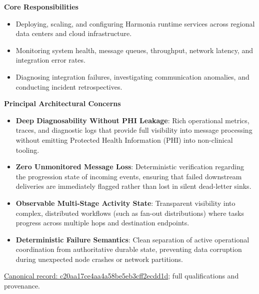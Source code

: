 \par\medskip\textbf{Core Responsibilities}\par


\begin{itemize}


\item Deploying, scaling, and configuring Harmonia runtime services across regional data centers and cloud infrastructure.

\item Monitoring system health, message queues, throughput, network latency, and integration error rates.

\item Diagnosing integration failures, investigating communication anomalies, and conducting incident retrospectives.

\end{itemize}


\par\medskip\textbf{Principal Architectural Concerns}\par


\begin{itemize}


\item \textbf{Deep Diagnosability Without PHI Leakage}: Rich operational metrics, traces, and diagnostic logs that provide full visibility into message processing without emitting Protected Health Information (PHI) into non-clinical tooling.

\item \textbf{Zero Unmonitored Message Loss}: Deterministic verification regarding the progression state of incoming events, ensuring that failed downstream deliveries are immediately flagged rather than lost in silent dead-letter sinks.

\item \textbf{Observable Multi-Stage Activity State}: Transparent visibility into complex, distributed workflows (such as fan-out distributions) where tasks progress across multiple hops and destination endpoints.

\item \textbf{Deterministic Failure Semantics}: Clean separation of active operational coordination from authoritative durable state, preventing data corruption during unexpected node crashes or network partitions.

\end{itemize}

{\footnotesize \href{../../../../continuum/motivation/stakeholder/c20aa17ce4aa4a58be5eb3cff2ecdd1d.md}{Canonical record: c20aa17ce4aa4a58be5eb3cff2ecdd1d}; full qualifications and provenance.}\par
